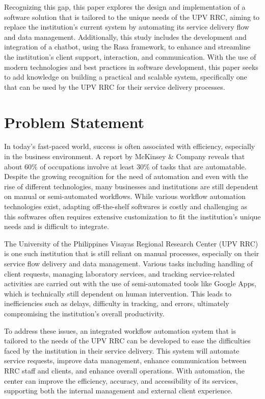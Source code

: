Recognizing this gap, this paper explores the design and implementation of a software solution that is tailored to the unique needs of the UPV RRC, aiming to replace the institution’s current system by automating its service delivery flow and data management. Additionally, this study includes the development and integration of a chatbot, using the Rasa framework, to enhance and streamline the institution’s client support, interaction, and communication. With the use of modern technologies and best practices in software development, this paper seeks to add knowledge on building a practical and scalable system, specifically one that can be used by the UPV RRC for their service delivery processes.

\section{Problem Statement}

In today’s fast-paced world, success is often associated with efficiency, especially in the business environment. A report by McKinsey \& Company \cite{manyika2017} reveals that about 60\% of occupations involve at least 30\% of tasks that are automatable. Despite the growing recognition for the need of automation and even with the rise of different technologies, many businesses and institutions are still dependent on manual or semi-automated workflows. While various workflow automation technologies exist, adapting off-the-shelf softwares is costly and challenging as this softwares often requires extensive customization to fit the institution’s unique needs and is difficult to integrate. 

The University of the Philippines Visayas Regional Research Center (UPV RRC) is one such institution that is still reliant on manual processes, especially on their service flow delivery and data management. Various tasks including handling of client requests, managing laboratory services, and tracking service-related activities are carried out with the use of semi-automated tools like Google Apps, which is technically still dependent on human intervention. This leads to inefficiencies such as delays, difficulty in tracking, and errors, ultimately compromising the institution’s overall productivity.

To address these issues, an integrated workflow automation system that is tailored to the needs of the UPV RRC can be developed to ease the difficulties faced by the institution in their service delivery. This system will  automate service requests, improve data management, enhance communication between RRC staff and clients, and enhance overall operations. With automation, the center can improve the efficiency, accuracy, and accessibility of its services, supporting both the internal management and external client experience.

